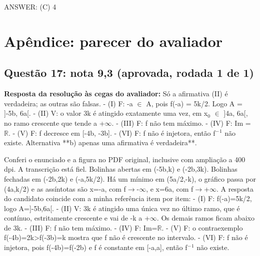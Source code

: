 \documentclass{article}%
\begin{document}
ANSWER: (C) 4%
\newpage%
\section*{Apêndice: parecer do avaliador}%
\subsection*{Questão 17: nota 9,3 (aprovada, rodada 1 de 1)}%
\textbf{Resposta da resolução às cegas do avaliador:} Só a afirmativa (II) é verdadeira; as outras são falsas.\newline%
{-} (I) F: -a $\in$ A, pois f(-a) = 5k/2. Logo A = {]}-5b, 6a{[}.\newline%
{-} (II) V: o valor 3k é atingido exatamente uma vez, em x$_{0}$ $\in$ {]}4a, 6a{[}, no ramo crescente que tende a +$\infty$.\newline%
{-} (III) F: f não tem máximo.\newline%
{-} (IV) F: Im = $\mathbb{R}$.\newline%
{-} (V) F: f decresce em {[}-4b, -3b{]}.\newline%
{-} (VI) F: f não é injetora, então f$^{-}$$^{1}$ não existe.\newline%
\newline%
Alternativa **b) apenas uma afirmativa é verdadeira**.\par %
Conferi o enunciado e a figura no PDF original, inclusive com ampliação a 400 dpi. A transcrição está fiel. Bolinhas abertas em (-5b,k) e (-2b,3k). Bolinhas fechadas em (-2b,2k) e (-a,5k/2). Há um mínimo em (5a/2,-k), o gráfico passa por (4a,k/2) e as assíntotas são x=-a, com f$\to$-$\infty$, e x=6a, com f$\to$+$\infty$.\newline%
\newline%
A resposta do candidato coincide com a minha referência item por item:\newline%
{-} (I) F: f(-a)=5k/2, logo A={]}-5b,6a{[}.\newline%
{-} (II) V: 3k é atingido uma única vez no último ramo, que é contínuo, estritamente crescente e vai de -k a +$\infty$. Os demais ramos ficam abaixo de 3k.\newline%
{-} (III) F: f não tem máximo.\newline%
{-} (IV) F: Im=$\mathbb{R}$.\newline%
{-} (V) F: o contraexemplo f(-4b)=2k>f(-3b)=k mostra que f não é crescente no intervalo.\newline%
{-} (VI) F: f não é injetora, pois f(-4b)=f(-2b) e f é constante em {[}-a,a{]}, então f$^{-}$$^{1}$ não existe.\newline%
\end{document}
